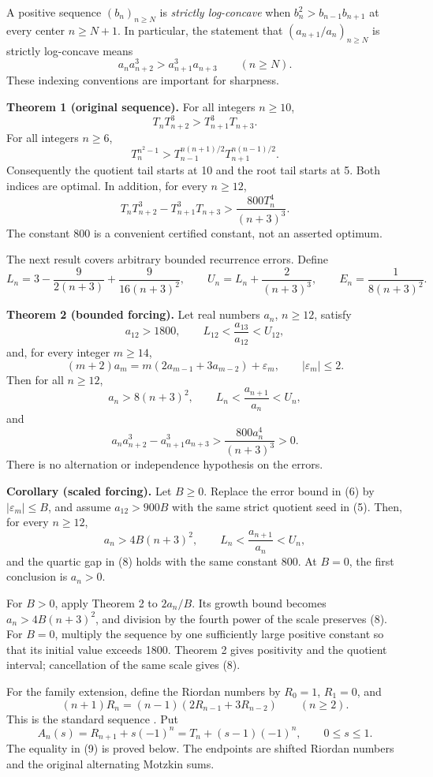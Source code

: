 \documentclass[
  11pt,
  a4paper,
]{article}
\begin{document}
A positive sequence \((b_n)_{n\ge N}\) is \emph{strictly log-concave}
when \(b_n^2>b_{n-1}b_{n+1}\) at every center \(n\ge N+1\). In
particular, the statement that \((a_{n+1}/a_n)_{n\ge N}\) is strictly
log-concave means \[
a_na_{n+2}^3>a_{n+1}^3a_{n+3}\qquad(n\ge N).
\] These indexing conventions are important for sharpness.

\textbf{Theorem 1 (original sequence).} For all integers \(n\ge10\), \[
T_nT_{n+2}^{3}>T_{n+1}^{3}T_{n+3}.
\tag{1}
\] For all integers \(n\ge6\), \[
T_n^{n^2-1}>
T_{n-1}^{n(n+1)/2}T_{n+1}^{n(n-1)/2}.
\tag{2}
\] Consequently the quotient tail starts at 10 and the root tail starts
at 5. Both indices are optimal. In addition, for every \(n\ge12\), \[
T_nT_{n+2}^{3}-T_{n+1}^{3}T_{n+3}
>\frac{800T_n^4}{(n+3)^3}.
\tag{3}
\] The constant 800 is a convenient certified constant, not an asserted
optimum.

The next result covers arbitrary bounded recurrence errors. Define \[
L_n=3-\frac9{2(n+3)}+\frac9{16(n+3)^2},\qquad
U_n=L_n+\frac2{(n+3)^3},\qquad E_n=\frac1{8(n+3)^2}.
\tag{4}
\]

\textbf{Theorem 2 (bounded forcing).} Let real numbers \(a_n\),
\(n\ge12\), satisfy \[
a_{12}>1800,\qquad L_{12}<\frac{a_{13}}{a_{12}}<U_{12},
\tag{5}
\] and, for every integer \(m\ge14\), \[
(m+2)a_m=m(2a_{m-1}+3a_{m-2})+\varepsilon_m,
\qquad |\varepsilon_m|\le2.
\tag{6}
\] Then for all \(n\ge12\), \[
a_n>8(n+3)^2,\qquad L_n<\frac{a_{n+1}}{a_n}<U_n,
\tag{7}
\] and \[
a_na_{n+2}^3-a_{n+1}^3a_{n+3}
>\frac{800a_n^4}{(n+3)^3}>0.
\tag{8}
\] There is no alternation or independence hypothesis on the errors.

\textbf{Corollary (scaled forcing).} Let \(B\ge0\). Replace the error
bound in (6) by \(|\varepsilon_m|\le B\), and assume \(a_{12}>900B\)
with the same strict quotient seed in (5). Then, for every \(n\ge12\),
\[
a_n>4B(n+3)^2,\qquad L_n<\frac{a_{n+1}}{a_n}<U_n,
\] and the quartic gap in (8) holds with the same constant 800. At
\(B=0\), the first conclusion is \(a_n>0\).

For \(B>0\), apply Theorem 2 to \(2a_n/B\). Its growth bound becomes
\(a_n>4B(n+3)^2\), and division by the fourth power of the scale
preserves (8). For \(B=0\), multiply the sequence by one sufficiently
large positive constant so that its initial value exceeds 1800. Theorem
2 gives positivity and the quotient interval; cancellation of the same
scale gives (8).

For the family extension, define the Riordan numbers by \(R_0=1\),
\(R_1=0\), and \[
(n+1)R_n=(n-1)(2R_{n-1}+3R_{n-2})\qquad(n\ge2).
\] This is the standard sequence \cite{O1}. Put \[
A_n(s)=R_{n+1}+s(-1)^n=T_n+(s-1)(-1)^n,
\qquad 0\le s\le1.
\tag{9}
\] The equality in (9) is proved below. The endpoints are shifted
Riordan numbers and the original alternating Motzkin sums.
\end{document}
